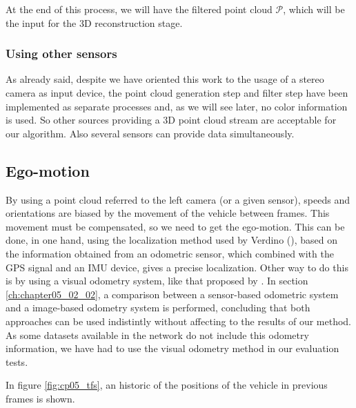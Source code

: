 At the end of this process, we will have the filtered point cloud $\mathcal{P}$, which will be the input for the 3D reconstruction stage.

\subsubsection{Using other sensors}\label{ch:chapter05_01_01_02}

As already said, despite we have oriented this work to the usage of a stereo camera as input device, the point cloud generation step and filter step have been implemented as separate processes and, as we will see later, no color information is used. So other sources providing a 3D point cloud stream are acceptable for our algorithm. Also several sensors can provide data simultaneously.

\subsection{Ego-motion}\label{ch:chapter05_01_02}

By using a point cloud referred to the left camera (or a given sensor), speeds and orientations are biased by the movement of the vehicle between frames. This movement must be compensated, so we need to get the ego-motion. This can be done, in one hand, using the localization method used by Verdino (\cite{Perea2013mcl}), based on the information obtained from an odometric sensor, which combined with the \ac{GPS} signal and an \ac{IMU} device, gives a precise localization. Other way to do this is by using a visual odometry system, like that proposed by \cite{geiger2011stereoscan}. In section \ref{ch:chapter05_02_02}, a comparison between a sensor-based odometric system and a image-based odometry system is performed, concluding that both approaches can be used indistintly without affecting to the results of our method. As some datasets available in the network do not include this odometry information, we have had to use the visual odometry method in our evaluation tests.

In figure \ref{fig:cp05_tfs}, an historic of the positions of the vehicle in previous frames is shown.

